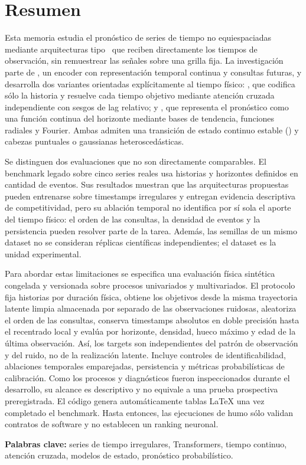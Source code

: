 \chapter*{Resumen}

Esta memoria estudia el pronóstico de series de tiempo no equiespaciadas mediante arquitecturas tipo \Transformer\ que reciben directamente los tiempos de observación, sin remuestrear las señales sobre una grilla fija. La investigación parte de \CTTransformer, un encoder con representación temporal continua y consultas futuras, y desarrolla dos variantes orientadas explícitamente al tiempo físico: \QueryCross, que codifica sólo la historia y resuelve cada tiempo objetivo mediante atención cruzada independiente con sesgos de lag relativo; y \ContinuousBasis, que representa el pronóstico como una función continua del horizonte mediante bases de tendencia, funciones radiales y Fourier. Ambas admiten una transición de estado continuo estable (\CTSSM) y cabezas puntuales o gaussianas heteroscedásticas.

Se distinguen dos evaluaciones que no son directamente comparables. El benchmark legado sobre cinco series reales usa historias y horizontes definidos en cantidad de eventos. Sus resultados muestran que las arquitecturas propuestas pueden entrenarse sobre timestamps irregulares y entregan evidencia descriptiva de competitividad, pero su ablación temporal no identifica por sí sola el aporte del tiempo físico: el orden de las consultas, la densidad de eventos y la persistencia pueden resolver parte de la tarea. Además, las semillas de un mismo dataset no se consideran réplicas científicas independientes; el dataset es la unidad experimental.

Para abordar estas limitaciones se especifica una evaluación física sintética congelada y versionada sobre procesos univariados y multivariados. El protocolo fija historias por duración física, obtiene los objetivos desde la misma trayectoria latente limpia almacenada por separado de las observaciones ruidosas, aleatoriza el orden de las consultas, conserva timestamps absolutos en doble precisión hasta el recentrado local y evalúa por horizonte, densidad, hueco máximo y edad de la última observación. Así, los targets son independientes del patrón de observación y del ruido, no de la realización latente. Incluye controles de identificabilidad, ablaciones temporales emparejadas, persistencia y métricas probabilísticas de calibración. Como los procesos y diagnósticos fueron inspeccionados durante el desarrollo, su alcance es descriptivo y no equivale a una prueba prospectiva preregistrada. El código genera automáticamente tablas LaTeX una vez completado el benchmark. Hasta entonces, las ejecuciones de humo sólo validan contratos de software y no establecen un ranking neuronal.

\noindent\textbf{Palabras clave:} series de tiempo irregulares, Transformers, tiempo continuo, atención cruzada, modelos de estado, pronóstico probabilístico.
